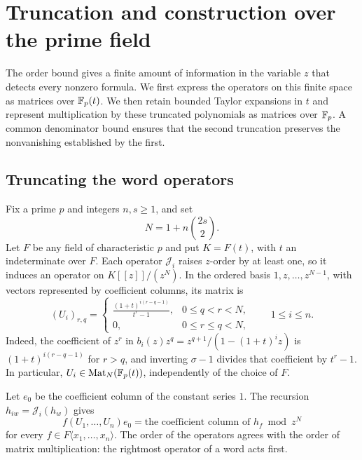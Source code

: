 \section{Truncation and construction over the prime field}
\label{sec:construction}

The order bound gives a finite amount of information in the variable $z$ that
detects every nonzero formula.  We first express the operators on this finite
space as matrices over $\mathbb F_p(t)$.  We then retain bounded Taylor expansions in
$t$ and represent multiplication by these truncated polynomials as matrices
over $\mathbb F_p$.  A common denominator bound ensures that the second truncation
preserves the nonvanishing established by the first.

\subsection{Truncating the word operators}

Fix a prime $p$ and integers $n,s\geq 1$, and set
\begin{equation}\label{eq:z-truncation-length}
  N=1+n\binom{2s}{2}.
\end{equation}
Let $F$ be any field of characteristic $p$ and put $K=F(t)$, with $t$ an
indeterminate over $F$.  Each operator $\mathcal J_i$ raises $z$-order by at
least one, so it induces an operator on $K[[z]]/(z^N)$.  In the ordered basis
$1,z,\ldots,z^{N-1}$, with vectors represented by coefficient columns, its
matrix is
\begin{equation}\label{eq:truncated-operators}
 (U_i)_{r,q}=
 \begin{cases}
 \displaystyle\frac{(1+t)^{i(r-q-1)}}{t^r-1},&0\leq q<r<N,\\[6pt]
 0,&0\leq r\leq q<N,
 \end{cases}
 \qquad 1\leq i\leq n.
\end{equation}
Indeed, the coefficient of $z^r$ in
$b_i(z)z^q=z^{q+1}/(1-(1+t)^i z)$ is $(1+t)^{i(r-q-1)}$ for $r>q$, and
inverting $\sigma-1$ divides that coefficient by $t^r-1$.  In particular,
$U_i\in\operatorname{Mat}_N(\mathbb F_p(t))$, independently of the choice of $F$.

Let $e_0$ be the coefficient column of the constant series $1$.  The recursion
$h_{iw}=\mathcal J_i(h_w)$ gives
\begin{equation}\label{eq:operator-evaluation}
 f(U_1,\ldots,U_n)e_0
   =\text{the coefficient column of }h_f\bmod z^N
\end{equation}
for every $f\in F\langle x_1,\ldots,x_n\rangle$.  The order of the operators
agrees with the order of matrix multiplication: the rightmost operator of a
word acts first.

